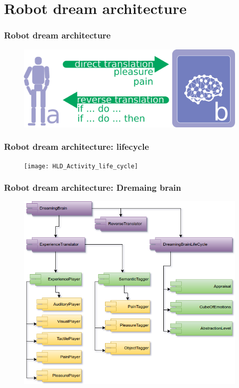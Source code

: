 \documentclass[12pt, aspectratio=169]{beamer}
\begin{document}
\section{Robot dream architecture}

\begin{frame}
\frametitle{Robot dream architecture}
\begin{figure}
\includegraphics[width=0.8\linewidth]{robot-dream_translations}
\end{figure}
\end{frame}


\begin{frame}
\frametitle{Robot dream architecture: lifecycle}
\begin{figure}
\texttt{[image: HLD\_Activity\_life\_cycle]}
\end{figure}
\end{frame}


\begin{frame}
\frametitle{Robot dream architecture: Dremaing brain}
\begin{figure}
\includegraphics[width=0.6\linewidth]{HLD_Component_MemristiveDreamingBrain.png}
\end{figure}
\end{frame}
\end{document}
